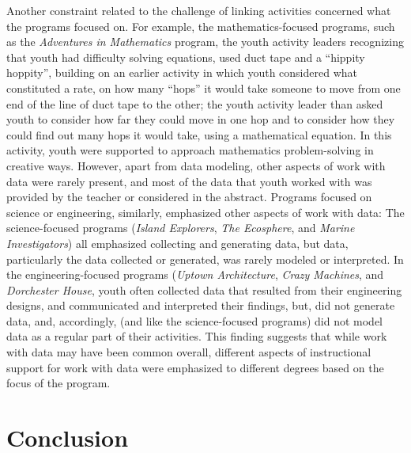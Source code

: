 \documentclass[]{msu-thesis}
\theoremstyle{definition}
\theoremstyle{definition}
\theoremstyle{definition}
\theoremstyle{remark}
\begin{document}
Another constraint related to the challenge of linking activities
concerned what the programs focused on. For example, the
mathematics-focused programs, such as the \emph{Adventures in
Mathematics} program, the youth activity leaders recognizing that youth
had difficulty solving equations, used duct tape and a ``hippity
hoppity'', building on an earlier activity in which youth considered
what constituted a rate, on how many ``hops'' it would take someone to
move from one end of the line of duct tape to the other; the youth
activity leader than asked youth to consider how far they could move in
one hop and to consider how they could find out many hops it would take,
using a mathematical equation. In this activity, youth were supported to
approach mathematics problem-solving in creative ways. However, apart
from data modeling, other aspects of work with data were rarely present,
and most of the data that youth worked with was provided by the teacher
or considered in the abstract. Programs focused on science or
engineering, similarly, emphasized other aspects of work with data: The
science-focused programs (\emph{Island Explorers}, \emph{The Ecosphere},
and \emph{Marine Investigators}) all emphasized collecting and
generating data, but data, particularly the data collected or generated,
was rarely modeled or interpreted. In the engineering-focused programs
(\emph{Uptown Architecture}, \emph{Crazy Machines}, and \emph{Dorchester
House}, youth often collected data that resulted from their engineering
designs, and communicated and interpreted their findings, but, did not
generate data, and, accordingly, (and like the science-focused programs)
did not model data as a regular part of their activities. This finding
suggests that while work with data may have been common overall,
different aspects of instructional support for work with data were
emphasized to different degrees based on the focus of the program.

\section{Conclusion}\label{conclusion}
\end{document}
